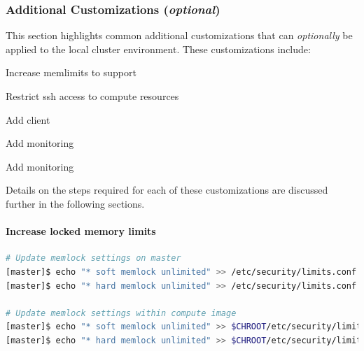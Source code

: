 \documentclass[letterpaper]{article}
\begin{document}



\subsubsection{Additional Customizations ({\em optional})} \label{sec:addl_customizations}

This section highlights common additional customizations that
can {\em optionally} be applied to the
local cluster environment. These customizations include:

\begin{itemize*}
\item Increase memlimits to support \InfiniBand{}
\item Restrict ssh access to compute resources
\item Add \Lustre{} client
\item Add \Nagios{} monitoring
\item Add \Ganglia{} monitoring
\end{itemize*}

\noindent Details on the steps required for each of these customizations are
discussed further in the following sections.

\paragraph{Increase locked memory limits}

 

\begin{lstlisting}[language=bash,keywords={},upquote=true]
# Update memlock settings on master
[master]$ echo "* soft memlock unlimited" >> /etc/security/limits.conf
[master]$ echo "* hard memlock unlimited" >> /etc/security/limits.conf

# Update memlock settings within compute image
[master]$ echo "* soft memlock unlimited" >> $CHROOT/etc/security/limits.conf
[master]$ echo "* hard memlock unlimited" >> $CHROOT/etc/security/limits.conf
\end{lstlisting}
\end{document}
